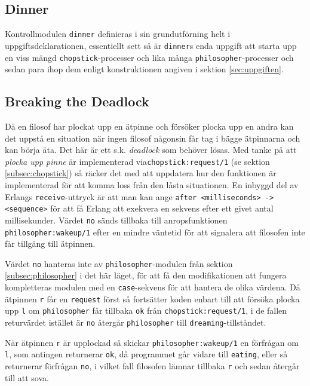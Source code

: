 \documentclass[a4paper, 11pt]{article}
\begin{document}
\subsection{Dinner}
Kontrollmodulen \texttt{dinner} definieras i sin grundutförning helt i uppgiftsdeklarationen, essentiellt sett så är \texttt{dinner}s enda uppgift att starta upp en viss mängd \texttt{chopstick}-processer och lika många \texttt{philosopher}-processer och sedan para ihop dem enligt konstruktionen angiven i sektion \ref{sec:uppgiften}.

\subsection{Breaking the Deadlock}
Då en filosof har plockat upp en ätpinne och försöker plocka upp en andra kan det uppstå en situation när ingen filosof någonsin får tag i bägge ätpinnarna och kan börja äta. Det här är ett s.k. \textit{deadlock} som behöver lösas. Med tanke på att \textit{plocka upp pinne} är implementerad via\texttt{chopstick:request/1} (se sektion \ref{subsec:chopstick}) så räcker det med att uppdatera hur den funktionen är implementerad för att komma loss från den låsta situationen. En inbyggd del av Erlangs \texttt{receive}-uttryck är att man kan ange \lstinline$after <milliseconds> -> <sequence>$ för att få Erlang att exekvera en sekvens efter ett givet antal millisekunder. Värdet \texttt{no} sänds tillbaka till anropsfunktionen \texttt{philosopher:wakeup/1} efter en mindre väntetid för att signalera att filosofen inte får tillgång till ätpinnen.

Värdet \texttt{no} hanteras inte av \texttt{philosopher}-modulen från sektion \ref{subsec:philosopher} i det här läget, för att få den modifikationen att fungera kompletteras modulen med en \texttt{case}-sekvens för att hantera de olika värdena. Då ätpinnen \texttt{r} får en \texttt{request} först så fortsätter koden enbart till att försöka plocka upp \texttt{l} om \texttt{philosopher} får tillbaka \texttt{ok} från \texttt{chopstick:request/1}, i de fallen returvärdet istället är \texttt{no} återgår \texttt{philosopher} till \texttt{dreaming}-tillståndet.

När ätpinnen \texttt{r} är upplockad så skickar \texttt{philosopher:wakeup/1} en förfrågan om \texttt{l}, som antingen returnerar \texttt{ok}, då programmet går vidare till \texttt{eating}, eller så returnerar förfrågan \texttt{no}, i vilket fall filosofen lämnar tillbaka \texttt{r} och sedan återgår till att sova.
\end{document}
